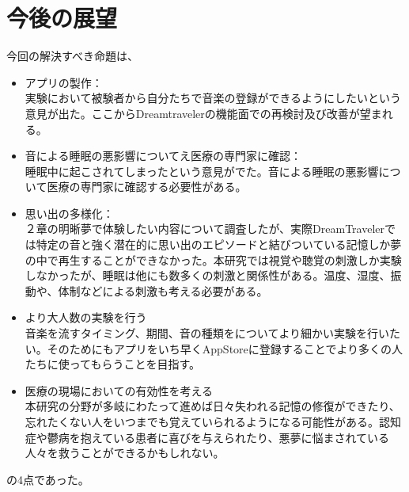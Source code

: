 \section{今後の展望}
今回の解決すべき命題は、
\begin{itemize}
\item アプリの製作：\\
実験において被験者から自分たちで音楽の登録ができるようにしたいという意見が出た。ここからDreamtravelerの機能面での再検討及び改善が望まれる。

\item 音による睡眠の悪影響についてえ医療の専門家に確認：\\
睡眠中に起こされてしまったという意見がでた。音による睡眠の悪影響について医療の専門家に確認する必要性がある。

\item 思い出の多様化：\\
２章の明晰夢で体験したい内容について調査したが、実際DreamTravelerでは特定の音と強く潜在的に思い出のエピソードと結びついている記憶しか夢の中で再生することができなかった。本研究では視覚や聴覚の刺激しか実験しなかったが、睡眠は他にも数多くの刺激と関係性がある。温度、湿度、振動や、体制などによる刺激も考える必要がある。

\item より大人数の実験を行う\\
音楽を流すタイミング、期間、音の種類をについてより細かい実験を行いたい。そのためにもアプリをいち早くAppStoreに登録することでより多くの人たちに使ってもらうことを目指す。

\item 医療の現場においての有効性を考える\\
本研究の分野が多岐にわたって進めば日々失われる記憶の修復ができたり、忘れたくない人をいつまでも覚えていられるようになる可能性がある。認知症や鬱病を抱えている患者に喜びを与えられたり、悪夢に悩まされている人々を救うことができるかもしれない。

\end{itemize}

の4点であった。